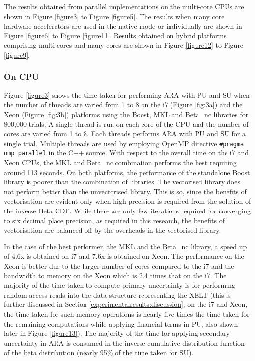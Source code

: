 The results obtained from parallel implementations on the multi-core CPUs are shown in Figure \ref{figure3} to Figure \ref{figure5}. The results when many core hardware accelerators are used in the native mode or individually are shown in Figure \ref{figure6} to Figure \ref{figure11}. Results obtained on hybrid platforms comprising multi-cores and many-cores are shown in Figure \ref{figure12} to Figure \ref{figure9}. 



\subsubsection{On CPU}
Figure \ref{figure3} shows the time taken for performing ARA with PU and SU when the number of threads are varied from 1 to 8 on the i7 (Figure \ref{fig:3a}) and the Xeon (Figure \ref{fig:3b}) platforms using the Boost, MKL and Beta\_nc libraries for 800,000 trials. 
A single thread is run on each core of the CPU and the number of cores are varied from 1 to 8. 
Each threads performs ARA with PU and SU for a single trial. 
Multiple threads are used by employing OpenMP directive \texttt{\small \#pragma omp parallel} in the C++ source. 
With respect to the overall time on the i7 and Xeon CPUs, the MKL and Beta\_nc combination performs the best requiring around 113 seconds.
On both platforms, the performance of the standalone Boost library is poorer than the combination of libraries. 
The vectorised library does not perform better than the unvectorised library. 
This is so, since the benefits of vectorisation are evident only when high precision is required from the solution of the inverse Beta CDF.
While there are only few iterations required for converging to six decimal place precision, as required in this research, the benefits of vectorisation are balanced off by the overheads in the vectorised library.

In the case of the best performer, the MKL and the Beta\_nc library, a speed up of 4.6x is obtained on i7 and 7.6x is obtained on Xeon. The performance on the Xeon is better due to the larger number of cores compared to the i7 and the bandwidth to memory on the Xeon which is 2.4 times that on the i7. The majority of the time taken to compute primary uncertainty is for performing random access reads into the data structure representing the XELT (this is further discussed in Section \ref{experimentalresults:discussion}; on the i7 and Xeon, the time taken for such memory operations is nearly five times the time taken for the remaining computations while applying financial terms in PU, also shown later in Figure \ref{figure13}). The majority of the time for applying secondary uncertainty in ARA is consumed in the inverse cumulative distribution function of the beta distribution (nearly 95\% of the time taken for SU). 

